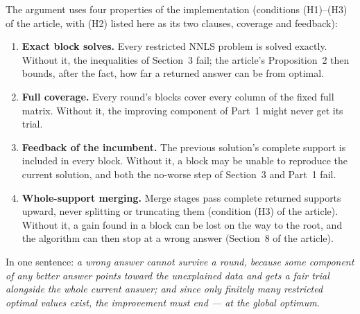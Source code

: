 \documentclass[pdflatex,sn-mathphys-num]{sn-jnl}
\begin{document}
The argument uses four properties of the implementation (conditions
(H1)--(H3) of the article, with (H2) listed here as its two clauses,
coverage and feedback):

\begin{enumerate}
\item \textbf{Exact block solves.} Every restricted NNLS problem is
  solved exactly. Without it, the inequalities of Section~3 fail; the
  article's Proposition~2 then bounds, after the fact, how far a
  returned answer can be from optimal.
\item \textbf{Full coverage.} Every round's blocks cover every column
  of the fixed full matrix. Without it, the improving component of
  Part~1 might never get its trial.
\item \textbf{Feedback of the incumbent.} The previous solution's
  complete support is included in every block. Without it, a block
  may be unable to reproduce the current solution, and both the
  no-worse step of Section~3 and Part~1 fail.
\item \textbf{Whole-support merging.} Merge stages pass complete
  returned supports upward, never splitting or truncating them
  (condition (H3) of the article). Without it, a gain found in a
  block can be lost on the way to the root, and the algorithm can
  then stop at a wrong answer (Section~8 of the article).
\end{enumerate}

\noindent In one sentence: \emph{a wrong answer cannot survive a
round, because some component of any better answer points toward the
unexplained data and gets a fair trial alongside the whole current
answer; and since only finitely many restricted optimal values exist,
the improvement must end --- at the global optimum.}
\end{document}
